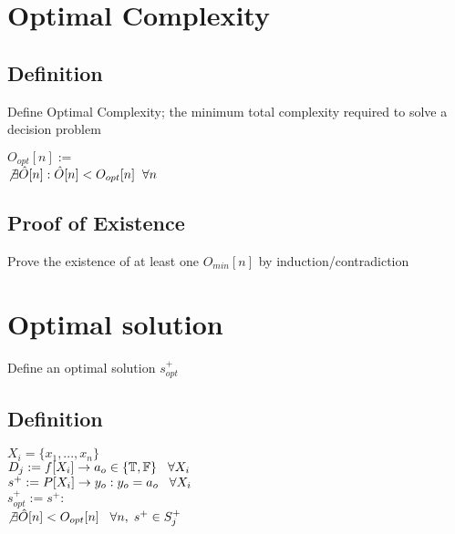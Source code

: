 \documentclass[11pt]{article}
\begin{document}
\newpage
\section{Optimal Complexity}

\subsection{Definition}
Define Optimal Complexity; the minimum total complexity required to solve a decision problem
\begin{center}
$O_{opt}[n] :=$
\\ \vspace{2mm}
$\not \exists \hat{O} \lbrack n \rbrack : \hat{O} \lbrack n \rbrack < O_{opt}[n] \hspace{2mm} \forall n$
\end{center}

\subsection{Proof of Existence}
Prove the existence of at least one $O_{min}[n]$ by induction/contradiction








\section{Optimal solution}
Define an optimal solution $s_{opt}^+$

\subsection{Definition}
\begin{center}
$
X_i = \{x_1,...,x_n\}
$
\\ \vspace{2mm}
$
D_j := f \lbrack X_i \rbrack \rightarrow a_{o} \in \{\mathbb{T}, \mathbb{F}\} \hspace{3mm} \forall X_i
$
\\ \vspace{2mm}
$
s^+ := P \lbrack X_i \rbrack \rightarrow y_{o} : y_o = a_{o} \hspace{3mm} \forall X_i
$
\\ \vspace{2mm}
$
s_{opt}^+ := s^+ :
$
\\ \vspace{2mm}
$
\not \exists \hat{O} \lbrack n \rbrack < O_{opt}[n] \hspace{3mm} \forall n, \hspace{1mm}  s^+ \in S_j^+
$
\end{center}
\end{document}
